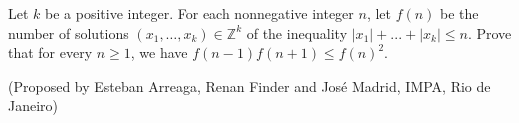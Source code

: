 Let $k$ be a positive integer. For each nonnegative integer $n$, let $f(n)$ be the number of solutions $(x_1,\ldots,x_k)\in\mathbb{Z}^k$ of the inequality $|x_1|+...+|x_k|\leq n$. Prove that for every $n\ge1$, we have $f(n-1)f(n+1)\leq f(n)^2$.

(Proposed by Esteban Arreaga, Renan Finder and José Madrid, IMPA, Rio de Janeiro)